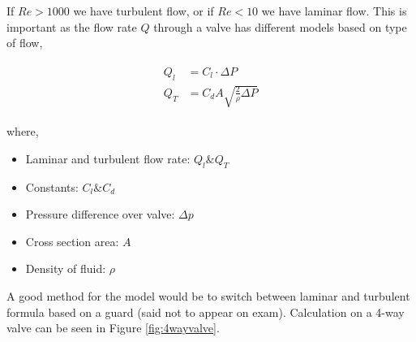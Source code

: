 If $Re > 1000$ we have turbulent flow, or if $Re < 10$ we have laminar flow. This is important as the flow rate $Q$ through a valve has different models based on type of flow,

\begin{align*}
    \begin{split}
        Q_l &= C_l \cdot \Delta P
        \\
        Q_T &= C_d A \sqrt{\frac{2}{\rho}\Delta P}
    \end{split}
\end{align*}

where,

\begin{itemize}
    \item Laminar and turbulent flow rate: $Q_l \& Q_T$
    \item Constants: $C_l \& C_d$
    \item Pressure difference over valve: $\Delta p$
    \item Cross section area: $A$
    \item Density of fluid: $\rho$
\end{itemize}

A good method for the model would be to switch between laminar and turbulent formula based on a guard (said not to appear on exam). Calculation on a 4-way valve can be seen in Figure \ref{fig:4wayvalve}.

